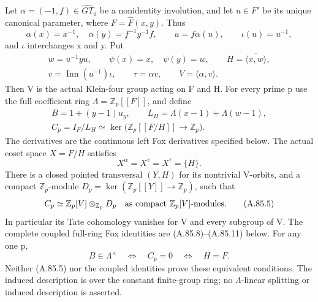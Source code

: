 Let \(\alpha=(-1,f)\in\widehat{GT}_0\) be a nonidentity
involution, and let \(u\in F'\) be its unique canonical parameter,
where \(F=\widehat F(x,y)\). Thus
\[
 \alpha(x)=x^{-1},\quad \alpha(y)=f^{-1}y^{-1}f,
 \qquad u=f\alpha(u),\qquad \iota(u)=u^{-1},
 \tag{A.85.1}
\]
and \(\iota\) interchanges x and y. Put
\[
 \begin{gathered}
 w=u^{-1}yu,\qquad \psi(x)=x,\quad\psi(y)=w,
 \qquad H=\overline{\langle x,w\rangle},\\
 v=\operatorname{Inn}(u^{-1})\iota,\qquad
 \tau=\alpha v,\qquad V=\langle\alpha,v\rangle.
 \end{gathered}
 \tag{A.85.2}
\]
Then V is the actual Klein-four group acting on F and H.
For every prime p use the full coefficient ring
\(\Lambda=\mathbb Z_p[[F]]\), and define
\[
 \begin{gathered}
 B=1+(y-1)u_y,\qquad
 L_H=\Lambda(x-1)+\Lambda(w-1),\\
 C_p=I_F/L_H
     \simeq\ker\bigl(\mathbb Z_p[[F/H]]\longrightarrow\mathbb Z_p\bigr).
 \end{gathered}
 \tag{A.85.3}
\]
The derivatives are the continuous left Fox derivatives specified below.
The actual coset space \(X=F/H\) satisfies
\[
       X^\alpha=X^v=X^\tau=\{H\}.
 \tag{A.85.4}
\]
There is a closed pointed transversal \((Y,H)\) for its nontrivial
V-orbits, and a compact \(\mathbb Z_p\)-module
\(D_p=\ker(\mathbb Z_p[[Y]]\to\mathbb Z_p)\), such that
\[
       C_p\simeq\mathbb Z_p[V]\otimes_{\mathbb Z_p}D_p
       \quad\hbox{as compact \(\mathbb Z_p[V]\)-modules}.
 \tag{A.85.5}
\]
In particular its Tate cohomology vanishes for V and every subgroup
of V. The complete coupled full-ring Fox identities are
(A.85.8)--(A.85.11) below. For any one p,
\[
       B\in\Lambda^\times
       \quad\Longleftrightarrow\quad C_p=0
       \quad\Longleftrightarrow\quad H=F.
 \tag{A.85.6}
\]
Neither (A.85.5) nor the coupled identities prove these equivalent
conditions. The induced description is over the constant finite-group
ring; no \(\Lambda\)-linear splitting or induced description is asserted.

